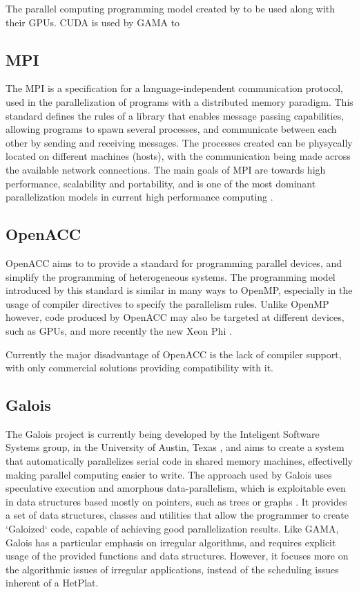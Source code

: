 \documentclass[main.tex]{subfiles}
\begin{document}
The parallel computing programming model created by \nvidia to be used along with their \acsp{GPU}. 
\acs{CUDA} is used by \acs{GAMA} to 


\subsection{\acs{MPI}}

The \acf{MPI} is a specification for a language-independent communication protocol, used in the parallelization of programs with a distributed memory paradigm. This standard defines the rules of a library that enables message passing capabilities, allowing programs to spawn several processes, and communicate between each other by sending and receiving messages. The processes created can be physycally located on different machines (hosts), with the communication being made across the available network connections. The main goals of \acs{MPI} are towards high performance, scalability and portability, and is one of the most dominant parallelization models in current high performance computing \cite{sur2006high}.


\subsection{\acs{OpenACC}}
\acs{OpenACC} aims to to provide a standard for programming parallel devices, and simplify the programming of heterogeneous systems.
The programming model introduced by this standard is similar in many ways to \acs{OpenMP}, especially in the usage of compiler directives to specify the parallelism rules. Unlike \acs{OpenMP} however, code produced by \acs{OpenACC} may also be targeted at different devices, such as \acsp{GPU}, and more recently the new \intel Xeon Phi \cite{openacc-phi2012}.

Currently the major disadvantage of \acs{OpenACC} is the lack of compiler support, with only commercial solutions providing compatibility with it.


\subsection{Galois}

The Galois project is currently being developed by the Inteligent Software Systems group, in the University of Austin, Texas , and aims to create a system that automatically parallelizes serial code in shared memory machines, effectivelly making parallel computing easier to write.
The approach used by Galois uses speculative execution and amorphous data-parallelism, which is exploitable even in data structures based mostly on pointers, such as trees or graphs \cite{pingaliamorphous,pingali2011tao}. It provides a set of data structures, classes and utilities that allow the programmer to create `Galoized` code, capable of achieving good parallelization results. Like \acs{GAMA}, Galois has a particular emphasis on irregular algorithms, and requires explicit usage of the provided functions and data structures. However, it focuses more on the algorithmic issues of irregular applications, instead of the scheduling issues inherent of a \acs{HetPlat}.
\end{document}
